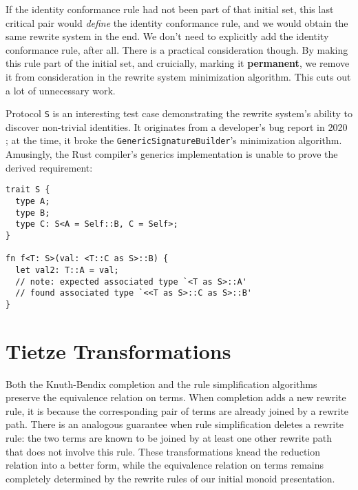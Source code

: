 \documentclass[../generics]{subfiles}
\begin{document}
\begin{example}
If the identity conformance rule had not been part of that initial set, this last critical pair would \emph{define} the identity conformance rule, and we would obtain the same rewrite system in the end. We don't need to explicitly add the identity conformance rule, after all. There is a practical consideration though. By making this rule part of the initial set, and cruicially, marking it \textbf{permanent}, we remove it from consideration in the rewrite system minimization algorithm. This cuts out a lot of unnecessary work.

\smallskip

Protocol \texttt{S} is an interesting test case demonstrating the rewrite system's ability to discover non-trivial identities. It originates from a developer's bug report in 2020 \cite{sr12120}; at the time, it broke the \texttt{GenericSignatureBuilder}'s minimization algorithm. Amusingly, the Rust compiler's generics implementation is unable to prove the derived requirement:
\begin{Verbatim}
trait S {
  type A;
  type B;
  type C: S<A = Self::B, C = Self>;
}

fn f<T: S>(val: <T::C as S>::B) {
  let val2: T::A = val;
  // note: expected associated type `<T as S>::A'
  // found associated type `<<T as S>::C as S>::B'
}
\end{Verbatim}
\end{example}

\section{Tietze Transformations}\label{tietze transformations}

Both the Knuth-Bendix completion and the rule simplification algorithms preserve the equivalence relation on terms. When completion adds a new rewrite rule, it is because the corresponding pair of terms are already joined by a rewrite path. There is an analogous guarantee when rule simplification deletes a rewrite rule: the two terms are known to be joined by at least one other rewrite path that does not involve this rule. These transformations knead the reduction relation into a better form, while the equivalence relation on terms remains completely determined by the rewrite rules of our initial monoid presentation.
\end{document}
